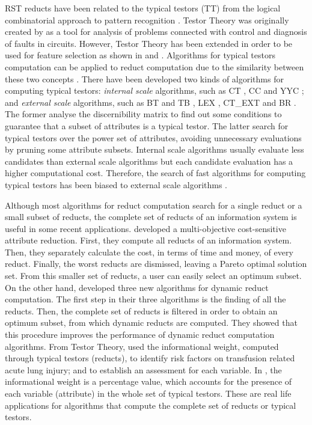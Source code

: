 \documentclass[authoryear,preprint,review,12pt]{elsarticle}
\begin{document}
     	
  RST reducts have been related to the typical testors (TT) from the logical combinatorial approach 
  to pattern recognition \citep{Chikalov2013}. Testor Theory was originally created by \cite{Cheguis55} as a tool
  for analysis of problems connected with control and diagnosis of faults in circuits. 
  However, Testor Theory has been extended in order to be used for feature selection as shown in \citep{Ruiz08}
  and \citep{Martinez01}. Algorithms for typical testors computation can be applied to reduct computation due to the similarity between these two concepts \citep{Lazo15}. There have been developed two kinds of algorithms for
  computing typical testors: \emph{internal scale} algorithms, such as CT \citep{Bravo83}, CC \citep{Aguila84} 
  and YYC \citep{Alba14}; and \emph{external scale} algorithms, such as BT and TB \citep{Ruiz85}, LEX
  \citep{Santiesteban03}, CT\_EXT \citep{Sanchez07} and BR \citep{Lias09}. The former analyse the discernibility
  matrix to find out some conditions to guarantee that a subset of attributes is a typical testor. The latter
  search for typical testors over the power set of attributes, avoiding unnecessary evaluations by pruning
  some attribute subsets. Internal scale algorithms usually evaluate less candidates than external scale
  algorithms but each candidate evaluation has a higher computational cost. Therefore, the search of fast 
  algorithms for computing typical testors has been biased to external scale algorithms \citep{Alba14}.
    
  Although most algorithms for reduct computation search for a single reduct or a small subset of reducts, 
  the complete set of reducts of an information system is useful in some recent applications. \cite{Xu2013}
  developed a multi-objective cost-sensitive attribute reduction. First, they compute all reducts of an 
  information system. Then, they separately calculate the cost, in terms of time and money, of every reduct. 
  Finally, the worst reducts are dismissed, leaving a Pareto optimal solution set. From this smaller set of 
  reducts, a user can easily select an optimum subset. On the other hand, \cite{Mukamakuza2014} developed 
  three new algorithms for dynamic reduct computation. 
  The first step in their three algorithms is the finding of all the reducts. Then, the complete set of reducts 
  is filtered in order to obtain an optimum subset, from which dynamic reducts are computed. They showed that 
  this procedure improves the performance of dynamic reduct computation algorithms.	
  From Testor Theory, \cite{Torres2014} used the informational weight, computed through typical testors 
  (reducts), to identify risk factors on transfusion related acute lung injury; and to establish an assessment
  for each variable.  In \citep{Torres2014}, the informational weight is a percentage value, which accounts 
  for the presence of each variable (attribute) in the whole set of typical testors. These are real life
  applications for algorithms that compute the complete set of reducts or typical testors.	
	
\end{document}

